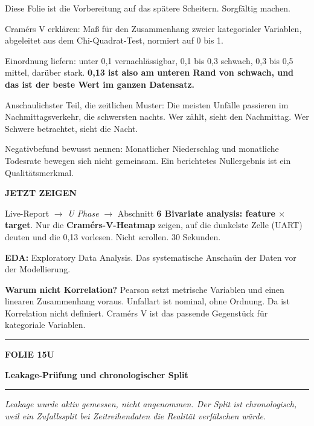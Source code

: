 \documentclass[9pt]{extarticle}
\newcommand{\karte}[3]{%
  \clearpage
  {\color{Accent}\rule{\linewidth}{2.4pt}}\par\vspace{2.5pt}
  {\fontsize{8}{9}\selectfont\bfseries\color{Accent}%
   FOLIE #1\hspace{1.2em}\textbar\hspace{1.2em}#2}\par\vspace{1pt}
  {\fontsize{16}{18}\selectfont\bfseries\color{AccentDark}#3}\par\vspace{3pt}
  {\color{Accent!45}\rule{\linewidth}{0.5pt}}\par\vspace{4pt}%
}
\newcommand{\rubrik}[1]{%
  \vspace{3.5pt}{\fontsize{7.5}{8.5}\selectfont\bfseries\color{Grau}%
  \MakeUppercase{#1}}\par\vspace{1.5pt}}
\newcommand{\kernsatz}[1]{%
  \begin{tcolorbox}[enhanced,sharp corners,boxrule=0pt,
    leftrule=2.2pt,colframe=Accent,colback=AccentPale,
    left=5pt,right=5pt,top=3.5pt,bottom=3.5pt,before skip=1pt,after skip=2pt]
    \color{AccentDark}\itshape #1
  \end{tcolorbox}}
\newcommand{\zeigen}[1]{%
  \begin{tcolorbox}[enhanced,sharp corners,boxrule=0pt,
    leftrule=2.2pt,colframe=Demo,colback=DemoPale,
    left=5pt,right=5pt,top=3.5pt,bottom=3.5pt,before skip=3pt,after skip=2pt]
    {\fontsize{7.5}{8.5}\selectfont\bfseries\color{Demo}JETZT ZEIGEN}\par\vspace{2pt}
    #1
  \end{tcolorbox}}
\newcommand{\bg}[2]{\item \textbf{#1:} #2}
\newcommand{\frage}[2]{\item \textbf{\color{AccentDark}#1} #2}
\begin{document}
\rubrik{Sagen}
\begin{sag}
  \item Diese Folie ist die Vorbereitung auf das spätere Scheitern. Sorgfältig machen.
  \item Cram\'ers V erklären: Maß für den Zusammenhang zweier kategorialer Variablen,
        abgeleitet aus dem Chi-Quadrat-Test, normiert auf 0 bis 1.
  \item Einordnung liefern: unter 0,1 vernachlässigbar, 0,1 bis 0,3 schwach, 0,3 bis 0,5 mittel,
        darüber stark. \textbf{0,13 ist also am unteren Rand von schwach, und das ist der beste
        Wert im ganzen Datensatz.}
  \item Anschaulichster Teil, die zeitlichen Muster: Die meisten Unfälle passieren im
        Nachmittagsverkehr, die schwersten nachts. Wer zählt, sieht den Nachmittag.
        Wer Schwere betrachtet, sieht die Nacht.
  \item Negativbefund bewusst nennen: Monatlicher Niederschlag und monatliche Todesrate bewegen
        sich nicht gemeinsam. Ein berichtetes Nullergebnis ist ein Qualitätsmerkmal.
\end{sag}

\zeigen{Live-Report $\rightarrow$ \textit{U Phase} $\rightarrow$ Abschnitt \textbf{6 Bivariate
analysis: feature $\times$ target}. Nur die \textbf{Cram\'ers-V-Heatmap} zeigen, auf die
dunkelste Zelle (UART) deuten und die 0,13 vorlesen. Nicht scrollen. 30 Sekunden.}

\rubrik{Begriffe und wenn gefragt}
\begin{begriff}
  \bg{EDA}{Exploratory Data Analysis. Das systematische Anschaün der Daten vor der Modellierung.}
  \frage{Warum nicht Korrelation?}{Pearson setzt metrische Variablen und einen linearen
    Zusammenhang voraus. Unfallart ist nominal, ohne Ordnung. Da ist Korrelation nicht definiert.
    Cram\'ers V ist das passende Gegenstück für kategoriale Variablen.}
\end{begriff}

\karte{15}{U}{Leakage-Prüfung und chronologischer Split}

\kernsatz{Leakage wurde aktiv gemessen, nicht angenommen. Der Split ist chronologisch, weil ein
Zufallssplit bei Zeitreihendaten die Realität verfälschen würde.}
\end{document}
